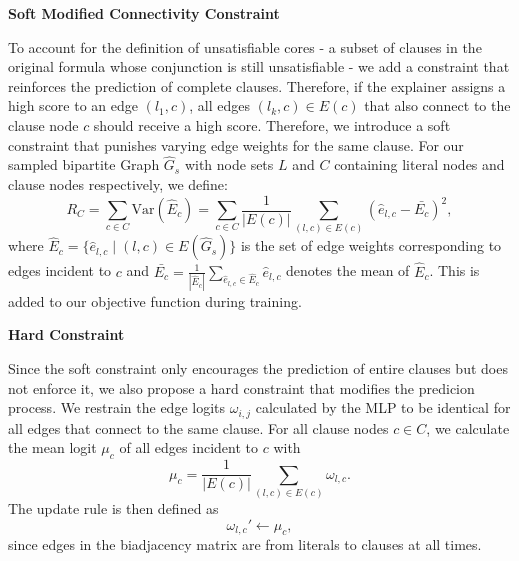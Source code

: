 \textbf{Soft Modified Connectivity Constraint}\par
To account for the definition of unsatisfiable cores - a subset of clauses in the original formula whose conjunction is still unsatisfiable - we add a constraint that reinforces the prediction of complete clauses. Therefore, if the explainer assigns a high score to an edge $(l_1,c)$, all edges $(l_k,c) \in E(c)$ that also connect to the clause node $c$ should receive a high score. Therefore, we introduce a soft constraint that punishes varying edge weights for the same clause. For our sampled bipartite Graph $\hat{G}_s$ with node sets $L$ and $C$ containing literal nodes and clause nodes respectively, we define:
\begin{equation}
    \label{eq:soft_restraint}
    R_C = \sum_{c \in C}  \text{Var}(\hat{E}_c) = \sum_{c \in C} \frac{1}{|E(c)|} \sum_{(l,c) \in E(c)} (\hat{e}_{l,c} - \bar{E_c})^2,
\end{equation}
where $\hat{E}_c = \{\hat{e}_{l,c} \mid (l,c)\in E(\hat{G}_s)\}$ is the set of edge weights corresponding to edges incident to $c$ and $\bar{E_c} = \frac{1}{|\hat{E}_c|}\sum_{\hat{e}_{l,c} \in \hat{E}_c} \hat{e}_{l,c}$ denotes the mean of $\hat{E}_c$. This is added to our objective function during training. \bigskip


\textbf{Hard Constraint}\par
Since the soft constraint only encourages the prediction of entire clauses but does not enforce it, we also propose a hard constraint that modifies the predicion process. We restrain the edge logits $\omega_{i,j}$ calculated by the MLP to be identical for all edges that connect to the same clause. %
For all clause nodes $c \in C$, we calculate the mean logit $\mu_c$ of all edges incident to $c$ with
\begin{equation}
    \mu_c = \frac{1}{|E(c)|} \sum_{(l,c)\in E(c)}\omega_{l,c}.
\end{equation}
The update rule is then defined as 
\begin{equation}
    \omega_{l,c}'\leftarrow \mu_c,
\end{equation}
since edges in the biadjacency matrix are from literals to clauses at all times.


